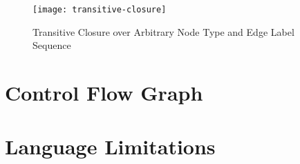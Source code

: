 \begin{figure}[htbp]
  \centering
  \texttt{[image: transitive-closure]}
  \caption{Transitive Closure over Arbitrary Node Type and Edge Label Sequence}
  \label{fig:transitive-closure}
\end{figure}


\section{Control Flow Graph}

\section{Language Limitations}
